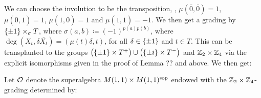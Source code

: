 We can choose the involution to be the transposition, \ie, $\mu(\bar 0, \bar 0) = 1$, $\mu(\bar 0, \bar 1) = 1$, $\mu(\bar 1, \bar 0) = 1$ and $\mu(\bar 1, \bar 1) = -1$. 
We then get a grading by $\{ \pm 1 \} \times_\sigma T$, where $\sigma(a,b) \coloneqq (-1)^{p(a)p(b)}$, where $\deg (X_t, \delta \overline{X_t}) = (\mu(t) \delta, t)$, for all $\delta \in \{ \pm 1 \}$ and $t\in T$. 
This can be transplanted to the groups $\big(\{ \pm 1 \} \times T^+\big) \cup \big(\{\pm i\} \times T^-\big)$ and $\mathbb{Z}_2\times \mathbb{Z}_4$ via the explicit isomorphisms given in the proof of Lemma ?? and above. 
We then get:

\begin{ex}\label{def:SA-O}
    Let $\mathcal O$ denote the superalgebra $M(1,1) \times M(1,1)^{\mathrm{sop}}$ endowed with the $\mathbb{Z}_2\times \mathbb{Z}_4$-grading determined by:
    \setlength\tabcolsep{2pt}
     \begin{center}
\end{center}
\end{ex}
